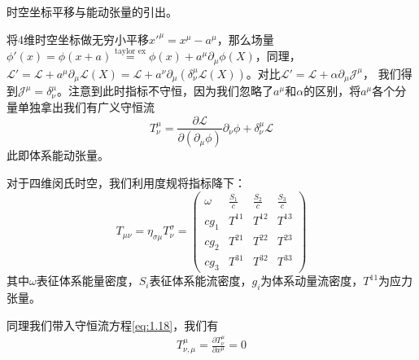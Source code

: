 \documentclass[../main.tex]{subfiles}
\begin{document}
\begin{example}{时空坐标平移与能动张量的引出。}

    将4维时空坐标做无穷小平移$x'^{\mu} = x^{\mu} - a^{\mu}$，那么场量$\phi'(x) = \phi(x+a) \overset{\text{taylor ex}}{=} \phi(x) + a^{\mu}\partial_{\mu}\phi(X) $，同理，
    $\mathcal{L}' = \mathcal{L} + a^{\mu}\partial_{\mu}\mathcal{L}(X) = \mathcal{L} + a^{\nu}\partial_{\mu}(\delta^{\mu}_{\nu}\mathcal{L}(X)) $。对比$\mathcal{L}' = \mathcal{L} + \alpha\partial_{\mu}\mathcal{J}^{\mu}$，
    我们得到$\mathcal{J}^{\mu} = \delta^{\mu}_{\nu}$。注意到此时指标不守恒，因为我们忽略了$a^{\mu}$和$\alpha$的区别，将$a^{\mu}$各个分量单独拿出我们有广义守恒流
    \begin{equation}
        T^{\mu}_{\nu} = \frac{\partial\mathcal{L}}{\partial(\partial_{\mu}\phi)} \partial_{\nu}\phi + \delta^{\mu}_{\nu}\mathcal{L}
    \end{equation}
    此即体系能动张量。

    对于四维闵氏时空，我们利用度规将指标降下：
    \begin{equation}
        T_{\mu\nu} = \eta_{\sigma \mu} T^{\sigma}_{\nu} = \begin{pmatrix}
            \omega & \frac{S_1}{c} & \frac{S_2}{c} & \frac{S_3}{c} \\
            cg_{1} & T^{11} & T^{12} & T^{13} \\
            cg_{2} & T^{21} & T^{22} & T^{23} \\
            cg_{3} & T^{31} & T^{32} & T^{33}
        \end{pmatrix}
    \end{equation}
    其中$\omega$表征体系能量密度，$S_i$表征体系能流密度，$g_i$为体系动量流密度，$T^{11}$为应力张量。

    同理我们带入守恒流方程\eqref{eq:1.18}，我们有
    \begin{eqnarray}
        T^{\mu}_{\nu,\mu} = \frac{\partial T^{\mu}_{\nu}}{\partial x^{\mu}} = 0 %
    \end{eqnarray}
\end{example}
\end{document}
